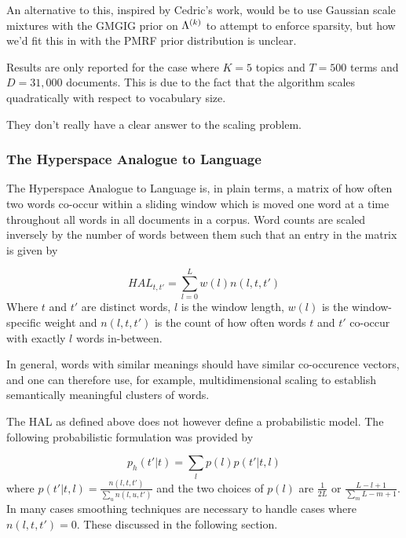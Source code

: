 An alternative to this, inspired by Cedric's work, would be to use Gaussian scale mixtures with the GMGIG prior \cite{Yang2013} on $\Lambda^{(k)}$ to attempt to enforce sparsity, but how we'd fit this in with the PMRF prior distribution is unclear.

Results are only reported for the case where $K=5$ topics and $T=500$ terms and $D=31,000$ documents. This is due to the fact that the algorithm scales quadratically with respect to vocabulary size. 

They don't really have a clear answer to the scaling problem.

\subsubsection{The Hyperspace Analogue to Language}
The Hyperspace Analogue to Language\cite{Lund1996} is, in plain terms, a matrix of how often two words co-occur within a sliding window which is moved one word at a time throughout all words in all documents in a corpus. Word counts are scaled inversely by the number of words between them such that an entry in the matrix is given by 

\begin{equation*}
HAL_{t,t'} = \sum_{l=0}^L w(l) n(l, t, t')
\end{equation*}
Where $t$ and $t'$ are distinct words, $l$ is the window length, $w(l)$ is the window-specific weight and $n(l, t, t')$ is the count of how often words $t$ and $t'$ co-occur with exactly $l$ words in-between.

In general, words with similar meanings should have similar co-occurence vectors, and one can therefore use, for example, multidimensional scaling to establish semantically meaningful clusters of words\cite{Lund1996}.

The HAL as defined above does not however define a probabilistic model. The following probabilistic formulation was provided by \cite{Azzopardi2005}

\begin{equation*}
p_h(t'|t) = \sum_l p(l) p(t'|t,l)
\end{equation*}
where $p(t'|t,l) = \frac{n(l, t, t')}{\sum_u n(l, u, t')}$ and the two choices of $p(l)$ are $\frac{1}{2L}$ or $\frac{L - l + 1}{\sum_m L - m + 1}$. In many cases smoothing techniques are necessary to handle cases where $n(l,t,t') = 0$. These discussed in the following section.





